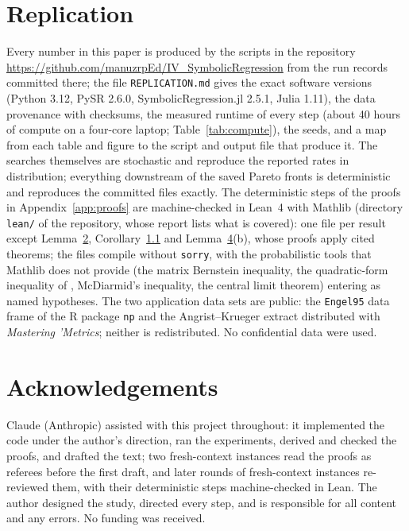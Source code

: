 \documentclass[11pt,a4paper]{article}
\DeclareRobustCommand{\resnum}[2]{\hyperref[res:#1#2]{#2}}
\DeclareRobustCommand{\res}[2]{#1~\resnum{#1}{#2}}
\newcommand{\code}[1]{\texttt{#1}}
\begin{document}
\section*{Replication}
Every number in this paper is produced by the scripts in the repository \url{https://github.com/manuzrpEd/IV_SymbolicRegression} from the run records committed there; the file \code{REPLICATION.md} gives the exact software versions (Python 3.12, PySR 2.6.0, SymbolicRegression.jl 2.5.1, Julia 1.11), the data provenance with checksums, the measured runtime of every step (about 40 hours of compute on a four-core laptop; Table~\ref{tab:compute}), the seeds, and a map from each table and figure to the script and output file that produce it. The searches themselves are stochastic and reproduce the reported rates in distribution; everything downstream of the saved Pareto fronts is deterministic and reproduces the committed files exactly. The deterministic steps of the proofs in Appendix~\ref{app:proofs} are machine-checked in Lean~4 with Mathlib (directory \code{lean/} of the repository, whose report lists what is covered): one file per result except \res{Lemma}{2}, \res{Corollary}{1.1} and \res{Lemma}{4}(b), whose proofs apply cited theorems; the files compile without \code{sorry}, with the probabilistic tools that Mathlib does not provide (the matrix Bernstein inequality, the quadratic-form inequality of \citet{hsukakadezhang2012}, McDiarmid's inequality, the central limit theorem) entering as named hypotheses. The two application data sets are public: the \code{Engel95} data frame of the R package \code{np} \citep{bck2007} and the Angrist--Krueger extract distributed with \emph{Mastering 'Metrics}; neither is redistributed. No confidential data were used.

\section*{Acknowledgements}
Claude (Anthropic) assisted with this project throughout: it implemented the code under the author's direction, ran the experiments, derived and checked the proofs, and drafted the text; two fresh-context instances read the proofs as referees before the first draft, and later rounds of fresh-context instances re-reviewed them, with their deterministic steps machine-checked in Lean. The author designed the study, directed every step, and is responsible for all content and any errors. No funding was received.



\appendix


\end{document}
